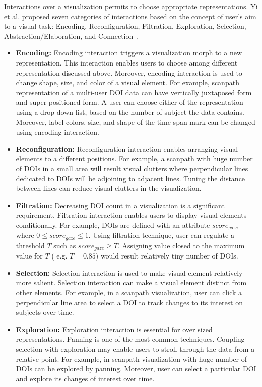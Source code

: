 Interactions over a visualization permits to choose appropriate representations. Yi et al. proposed seven categories of interactions based on the concept of user's aim to a visual task: Encoding, Reconfiguration, Filtration, Exploration, Selection, Abstraction/Elaboration, and Connection~\cite{yi2007toward}. 

\begin{itemize}
	\item \textbf{Encoding:} Encoding interaction triggers a visualization morph to a new representation. This interaction enables users to choose among different representation discussed above. Moreover, encoding interaction is used to change shape, size, and color of a visual element. For example, scanpath representation of a multi-user DOI data can have vertically juxtaposed form and super-positioned form. A user can choose either of the representation using a drop-down list, based on the number of subject the data contains. Moreover, label-colors, size, and shape of the time-span mark can be changed using encoding interaction. 
	\item \textbf{Reconfiguration:} Reconfiguration interaction enables arranging visual elements to a different positions. For example, a scanpath with huge number of DOIs in a small area will result visual clutters where perpendicular lines dedicated to DOIs will be adjoining to adjacent lines. Tuning the distance between lines can reduce visual clutters in the visualization. 
	\item \textbf{Filtration:} Decreasing DOI count in a visualization is a significant requirement. Filtration interaction enables users to display visual elements conditionally. For example, DOIs are defined with an attribute $score_{gaze}$ where $0 \leq score_{gaze} \leq 1$. Using filtration technique, user can regulate a threshold $T$ such as $score_{gaze} \geq T$. Assigning  value closed to the maximum value for $T$ ( e.g. $T =0.85$) would result relatively tiny number of DOIs. 
	\item \textbf{Selection:} Selection interaction is used to make visual element relatively more salient. Selection interaction can make a visual element distinct from other elements. For example, in a scanpath visualization, user can click a perpendicular line area to select a DOI to track changes to its interest on subjects over time. 
	\item \textbf{Exploration:} Exploration interaction is essential for over sized representations. Panning is one of the most common techniques. Coupling selection with exploration may enable users to stroll through the data from a relative point. For example, in scanpath visualization with huge number of DOIs can be explored by panning. Moreover, user can select a particular DOI and explore its changes of interest over time. 

\end{itemize}
